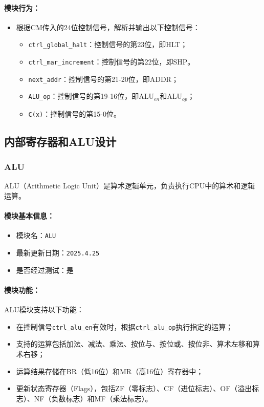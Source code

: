 \documentclass[lang=cn,a4paper,newtx]{elegantpaper}
\begin{document}
\paragraph{模块行为：}
\begin{itemize}
  \item 根据CM传入的24位控制信号，解析并输出以下控制信号：
    \begin{itemize}
      \item \texttt{ctrl\_global\_halt}：控制信号的第23位，即HLT；
      \item \texttt{ctrl\_mar\_increment}：控制信号的第22位，即SHP。
      \item \texttt{next\_addr}：控制信号的第21-20位，即ADDR；
      \item \texttt{ALU\_op}：控制信号的第19-16位，即$\text{ALU}_{en}$和$\text{ALU}_{op}$；
      \item \texttt{C(x)}：控制信号的第15-0位。
    \end{itemize}
\end{itemize}


\subsection{内部寄存器和ALU设计}
\subsubsection{ALU}
ALU（Arithmetic Logic Unit）是算术逻辑单元，负责执行CPU中的算术和逻辑运算。

\paragraph{模块基本信息：}
\begin{itemize}
  \item 模块名：\texttt{ALU}
  \item 最新更新日期：\texttt{2025.4.25}
  \item 是否经过测试：是
\end{itemize}

\paragraph{模块功能：}
ALU模块支持以下功能：
\begin{itemize}
  \item 在控制信号\texttt{ctrl\_alu\_en}有效时，根据\texttt{ctrl\_alu\_op}执行指定的运算；
  \item 支持的运算包括加法、减法、乘法、按位与、按位或、按位非、算术左移和算术右移；
  \item 运算结果存储在BR（低16位）和MR（高16位）寄存器中；
  \item 更新状态寄存器（Flags），包括ZF（零标志）、CF（进位标志）、OF（溢出标志）、NF（负数标志）和MF（乘法标志）。
\end{itemize}
\end{document}
